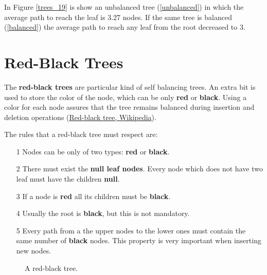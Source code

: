 In Figure \ref{trees_19} is show an unbalanced tree (\ref{unbalanced}) in which the average path to reach the leaf is 3.27 nodes. If the same tree is balanced (\ref{balanced}) the average path to reach any leaf from the root decreased to 3.

\section{Red-Black Trees}
The \textbf{red-black trees} are particular kind of self balancing trees. An extra bit is used to store the color of the node, which can be only \textbf{red} or \textbf{black}. Using a color for each node assures that the tree remains balanced during insertion and deletion operations \cite{wikiblackred} (\href{https://en.wikipedia.org/wiki/Red%E2%80%93black_tree}{Red-black tree, Wikipedia}).

The rules that a red-black tree must respect are:
\begin{itemize}
\item[1] Nodes can be only of two types: \textbf{red} or \textbf{black}.
\item[2] There must exist the \textbf{null leaf nodes}. Every node which does not have two leaf must have the children \textbf{null}.
\item[3] If a node is \textbf{red} all its children must be \textbf{black}.
\item[4] Usually the root is \textbf{black}, but this is not mandatory.
\item[5] Every path from a the upper nodes to the lower ones must contain the same number of \textbf{black} nodes. This property is very important when inserting new nodes.
\end{itemize}

\begin{figure}[H]
\centering
{}
\caption[A red-black tree.]{A red-black tree.}
\label{trees_20}
\end{figure}

